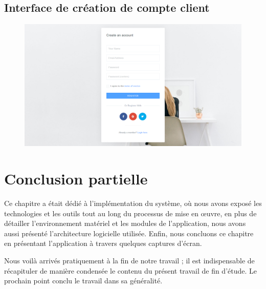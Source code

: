             \subsection[Interface de création de compte client]{Interface de création de compte client}
            \begin{figure}[H]
                \centering
                \includegraphics[width=130mm]{images/presentation-de-la-solution/creer-compte.png}
                \label{fig:mdSysteme}
            \end{figure}
    \section[Conclusion partielle]{Conclusion partielle}
    Ce chapitre a était dédié à l’implémentation du système, où nous avons exposé
    les technologies et les outils tout au long du processus de mise en œuvre,
    en plus de détailler l’environnement matériel et les modules de l’application,
    nous avons aussi présenté l’architecture logicielle utilisée. Enfin, nous concluons ce chapitre en présentant l’application à travers quelques
    captures d’écran.
    \par
    Nous voilà arrivés pratiquement à la fin de notre travail ; il est indispensable de récapituler
    de manière condensée le contenu du présent travail de fin d’étude. Le prochain point
    conclu le travail dans sa généralité.